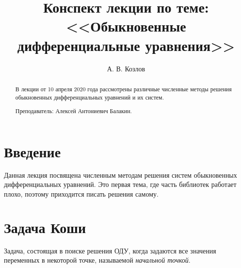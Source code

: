 \documentclass[a4,14pt,russian]{article}
\title{Конспект лекции по теме: <<Обыкновенные дифференциальные уравнения>>}
\author{А. В. Козлов}
\begin{document}
\maketitle
\begin{abstract}
    В лекции от 10 апреля 2020 года рассмотрены различные численные методы решения обыкновенных дифференциальных уравнений и их систем. 
    \par Преподаватель: {\sc Алексей Антониевич Балакин}.
\end{abstract}
\tableofcontents
\newpage
\section{Введение}
     Данная лекция посвящена численным методам решения систем обыкновенных дифференциальных уравнений. Это первая тема, где часть библиотек работает плохо, поэтому приходится писать решения самому.
\section{Задача Коши}
    Задача, состоящая в поиске решения ОДУ, когда задаются все значения переменных в некоторой точке, называемой {\it начальной точкой}.
\end{document}
